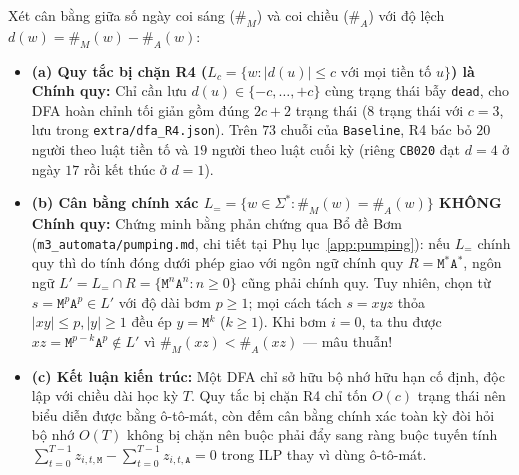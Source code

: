 Xét cân bằng giữa số ngày coi sáng ($\#_M$) và coi chiều ($\#_A$) với độ lệch $d(w) = \#_M(w) - \#_A(w)$:
\begin{itemize}
    \item \textbf{(a) Quy tắc bị chặn R4 ($L_c = \{w : |d(u)| \le c \text{ với mọi tiền tố } u\}$) là Chính quy:} Chỉ cần lưu $d(u) \in \{-c, \dots, +c\}$ cùng trạng thái bẫy \texttt{dead}, cho DFA hoàn chỉnh tối giản gồm đúng $2c + 2$ trạng thái ($8$ trạng thái với $c = 3$, lưu trong \texttt{extra/dfa\_R4.json}). Trên $73$ chuỗi của \texttt{Baseline}, R4 bác bỏ $20$ người theo luật tiền tố và $19$ người theo luật cuối kỳ (riêng \texttt{CB020} đạt $d=4$ ở ngày $17$ rồi kết thúc ở $d=1$).
    \item \textbf{(b) Cân bằng chính xác $L_= = \{w \in \Sigma^* : \#_M(w) = \#_A(w)\}$ KHÔNG Chính quy:} Chứng minh bằng phản chứng qua Bổ đề Bơm (\texttt{m3\_\allowbreak automata/\allowbreak pumping.md}, chi tiết tại Phụ lục~\ref{app:pumping}): nếu $L_=$ chính quy thì do tính đóng dưới phép giao với ngôn ngữ chính quy $R = \texttt{M}^*\texttt{A}^*$, ngôn ngữ $L' = L_= \cap R = \{\texttt{M}^n\texttt{A}^n : n \ge 0\}$ cũng phải chính quy. Tuy nhiên, chọn từ $s = \texttt{M}^p \texttt{A}^p \in L'$ với độ dài bơm $p \ge 1$; mọi cách tách $s = xyz$ thỏa $|xy| \le p, |y| \ge 1$ đều ép $y = \texttt{M}^k$ ($k \ge 1$). Khi bơm $i = 0$, ta thu được $xz = \texttt{M}^{p-k}\texttt{A}^p \notin L'$ vì $\#_M(xz) < \#_A(xz)$ --- mâu thuẫn!
    \item \textbf{(c) Kết luận kiến trúc:} Một DFA chỉ sở hữu bộ nhớ hữu hạn cố định, độc lập với chiều dài học kỳ $T$. Quy tắc bị chặn R4 chỉ tốn $O(c)$ trạng thái nên biểu diễn được bằng ô-tô-mát, còn đếm cân bằng chính xác toàn kỳ đòi hỏi bộ nhớ $O(T)$ không bị chặn nên buộc phải đẩy sang ràng buộc tuyến tính $\sum_{t=0}^{T-1} z_{i, t, \texttt{M}} - \sum_{t=0}^{T-1} z_{i, t, \texttt{A}} = 0$ trong ILP thay vì dùng ô-tô-mát.
\end{itemize}
\FloatBarrier